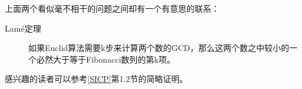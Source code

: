 上面两个看似毫不相干的问题之间却有一个有意思的联系：


\begin{description}
\item[{Lamé定理}]


如果Euclid算法需要k步来计算两个数的GCD，那么这两个数之中较小的一个必然大于等于Fibonacci数列的第k项。


\end{description}


感兴趣的读者可以参考\hyperlink{db.bi01.bibli.sicp}{[SICP]}第1.\BookSplit{}2节的简略证明。

